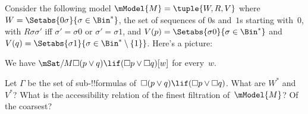 \documentclass[../../../include/open-logic-section]{subfiles}
\begin{document}
\begin{prob}
  Consider the following model $\mModel{M} = \tuple{W, R, V}$ where $W
  = \Setabs{0\sigma}{\sigma \in \Bin^*}$, the set of sequences of $0$s
  and~$1$s starting with~$0$, with $R\sigma\sigma'$ iff $\sigma' =
  \sigma 0$ or $\sigma' = \sigma 1$, and $V(p) = \Setabs{\sigma
    0}{\sigma \in \Bin^*}$ and $V(q) = \Setabs{\sigma 1}{\sigma \in
    \Bin^* \setminus \{1\}}$. Here's a picture:
  \begin{center}
  \end{center}
  We have $\mSat/{M}{\Box(p \lor q) \lif (\Box p \lor \Box q)}[w]$ for
  every~$w$.

  Let $\Gamma$ be the set of sub-!!{formula}s of~$\Box(p \lor q) \lif
  (\Box p \lor \Box q)$. What are $W^*$ and~$V^*$?  What is the
  accessibility relation of the finest filtration of~$\mModel{M}$? Of the
  coarsest?
\end{prob}
\end{document}
